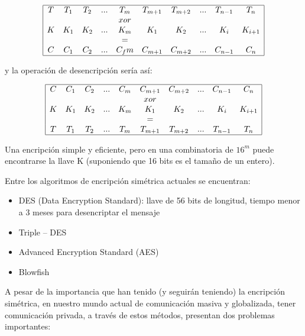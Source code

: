 \[
\begin{array}{|cccccccccc|}
  \hline
  T   & T_1 & T_2 & ... & T_m & T_{m+1} & T_{m+2} & ... & T_{n-1} & T_n \\ 
  &    &    &     &  xor &      &      &     &      &      \\
  K   & K_1 & K_2 & ... & K_m & K_1   & K_2   & ... & K_i   & K_{i+1} \\
  &    &    &     &  =   &      &      &     &      &      \\
  C   & C_1 & C_2 & ... & C_fm & C_{m+1} & C_{m+2} & ... & C_{n-1} & C_n \\
  \hline
\end{array}
\]

y la operación de desencripción sería así:

\[
\begin{array}{|cccccccccc|}
\hline
  C   & C_1 & C_2 & ... & C_m & C_{m+1} & C_{m+2} & ... & C_{n-1} & C_n\\
       &    &    &     &    & xor     &      &     &      &      \\
  K   & K_1 & K_2 & ... & K_m & K_1   & K_2   & ... & K_i   & K_{i+1}\\
      &    &    &     &    &  =    &      &     &      &      \\
  T   & T_1 & T_2 & ... & T_m & T_{m+1} & T_{m+2} & ... & T_{n-1} & T_n\\
\hline
\end{array}
\]

Una encripción simple y eficiente, pero en una combinatoria de $16^m$
puede encontrarse la llave K (suponiendo que 16 bits es el tamaño de
un entero).

Entre los algoritmos de encripción simétrica actuales se encuentran:

\begin{itemize}
\item DES (Data Encryption Standard): llave de 56 bits de longitud,
  tiempo menor a 3 meses para desencriptar el mensaje
\item Triple – DES
\item Advanced Encryption Standard  (AES)
\item Blowfish
\end{itemize}
    
A pesar de la importancia que han tenido (y seguirán teniendo) la
encripción simétrica, en nuestro mundo actual de comunicación masiva y
globalizada, tener comunicación privada, a través de estos métodos,
presentan dos problemas importantes:

